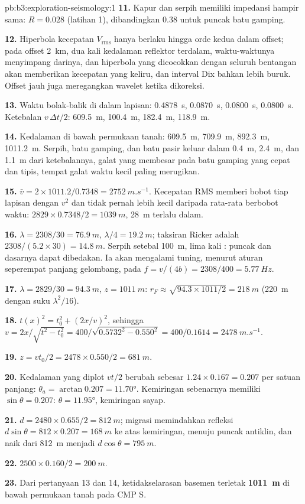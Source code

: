 \begin{solution}{pb:b3:exploration-seismology:1}
\textbf{11.} Kapur dan serpih memiliki impedansi hampir sama: $R = 0.028$
(latihan 1), dibandingkan 0.38 untuk puncak batu gamping.

\textbf{12.} Hiperbola kecepatan $V_{\text{rms}}$ hanya berlaku hingga orde kedua
dalam offset; pada offset \qty{2}{km}, dua kali kedalaman reflektor terdalam,
waktu-waktunya menyimpang darinya, dan hiperbola yang dicocokkan dengan seluruh bentangan
akan memberikan kecepatan yang keliru, dan interval Dix bahkan lebih buruk. Offset jauh
juga meregangkan wavelet ketika dikoreksi.

\textbf{13.} Waktu bolak-balik di dalam lapisan: \qty{0.4878}{s}, \qty{0.0870}{s},
\qty{0.0800}{s}, \qty{0.0800}{s}. Ketebalan $v\,\Delta t/2$: \qty{609.5}{m},
\qty{100.4}{m}, \qty{182.4}{m}, \qty{118.9}{m}.

\textbf{14.} Kedalaman di bawah permukaan tanah: \qty{609.5}{m}, \qty{709.9}{m},
\qty{892.3}{m}, \qty{1011.2}{m}. Serpih, batu gamping, dan batu pasir keluar
dalam \qty{0.4}{m}, \qty{2.4}{m}, dan \qty{1.1}{m} dari ketebalannya, galat
yang membesar pada batu gamping yang cepat dan tipis, tempat galat waktu kecil
paling merugikan.

\textbf{15.} $\bar v = 2\times1011.2/0.7348 = \qty{2752}{m.s^{-1}}$. Kecepatan RMS
memberi bobot tiap lapisan dengan $v^2$ dan tidak pernah lebih kecil daripada rata-rata
berbobot waktu: $2829\times0.7348/2 = \qty{1039}{m}$, \qty{28}{m} terlalu dalam.

\textbf{16.} $\lambda = 2308/30 = \qty{76.9}{m}$, $\lambda/4 = \qty{19.2}{m}$;
taksiran Ricker adalah $2308/(5.2\times30) = \qty{14.8}{m}$. Serpih
setebal \qty{100}{m}, lima kali : puncak dan dasarnya
dapat dibedakan. Ia akan mengalami tuning, menurut aturan seperempat panjang gelombang, pada $f = v/(4b) =
2308/400 = \qty{5.77}{Hz}$.

\textbf{17.} $\lambda = 2829/30 = \qty{94.3}{m}$, $z = \qty{1011}{m}$:
$r_F \approx \sqrt{94.3\times1011/2} = \qty{218}{m}$ (\qty{220}{m} dengan
suku $\lambda^2/16$).

\textbf{18.} $t(x)^2 = t_0^2 + (2x/v)^2$, sehingga $v = 2x/\sqrt{t^2 - t_0^2} =
400/\sqrt{0.5732^2 - 0.550^2} = 400/0.1614 = \qty{2478}{m.s^{-1}}$.

\textbf{19.} $z = vt_0/2 = 2478\times0.550/2 = \qty{681}{m}$.

\textbf{20.} Kedalaman yang diplot $vt/2$ berubah sebesar $1.24\times0.167 = 0.207$ per
satuan panjang: $\theta_a = \arctan0.207 = \ang{11.70}$. Kemiringan sebenarnya memiliki
$\sin\theta = 0.207$: $\theta = \ang{11.95}$, kemiringan sayap.

\textbf{21.} $d = 2480\times0.655/2 = \qty{812}{m}$; migrasi memindahkan
refleksi $d\sin\theta = 812\times0.207 = \qty{168}{m}$ ke atas kemiringan, menuju
puncak antiklin, dan naik dari \qty{812}{m} menjadi $d\cos\theta =
\qty{795}{m}$.

\textbf{22.} $2500\times0.160/2 = \qty{200}{m}$.

\textbf{23.} Dari pertanyaan 13 dan 14, ketidakselarasan basemen terletak
\textbf{\qty[text-series-to-math=true]{1011}{m}} di bawah permukaan tanah pada CMP S.
\end{solution}
